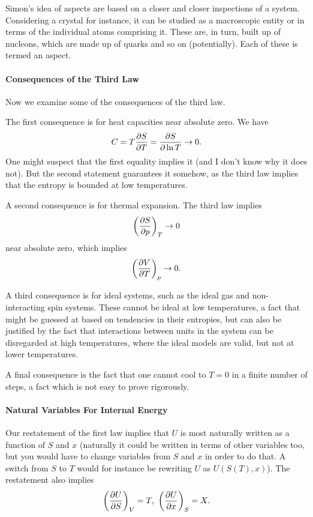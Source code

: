 Simon's idea of aspects are based on a closer and closer inspections of a system. Considering a crystal for instance, it can be studied as a macroscopic entity or in terms of the individual atoms comprising it. These are, in turn, built up of nucleons, which are made up of quarks and so on (potentially). Each of these is termed an aspect.

\paragraph{Consequences of the Third Law}
Now we examine some of the consequences of the third law.

The first consequence is for heat capacities near absolute zero. We have
\begin{align*}
	C = T\pdv{S}{T} = \pdv{S}{\ln{T}} \to 0.
\end{align*}
One might suspect that the first equality implies it (and I don't know why it does not). But the second statement guarantees it somehow, as the third law implies that the entropy is bounded at low temperatures.

A second consequence is for thermal expansion. The third law implies
\begin{align*}
	\left(\pdv{S}{p}\right)_{T} \to 0
\end{align*}
near absolute zero, which implies
\begin{align*}
	\left(\pdv{V}{T}\right)_{p} \to 0.
\end{align*}

A third consequence is for ideal systems, such as the ideal gas and non-interacting spin systems. These cannot be ideal at low temperatures, a fact that might be guessed at based on tendencies in their entropies, but can also be justified by the fact that interactions between units in the system can be disregarded at high temperatures, where the ideal models are valid, but not at lower temperatures.

A final consequence is the fact that one cannot cool to $T = 0$ in a finite number of steps, a fact which is not easy to prove rigorously.

\paragraph{Natural Variables For Internal Energy}
Our restatement of the first law implies that $U$ is most naturally written as a function of $S$ and $x$ (naturally it could be written in terms of other variables too, but you would have to change variables from $S$ and $x$ in order to do that. A switch from $S$ to $T$ would for instance be rewriting $U$ as $U(S(T), x)$). The restatement also implies
\begin{align*}
	\left(\pdv{U}{S}\right)_{V} = T,\ \left(\pdv{U}{x}\right)_{S} = X.
\end{align*}

